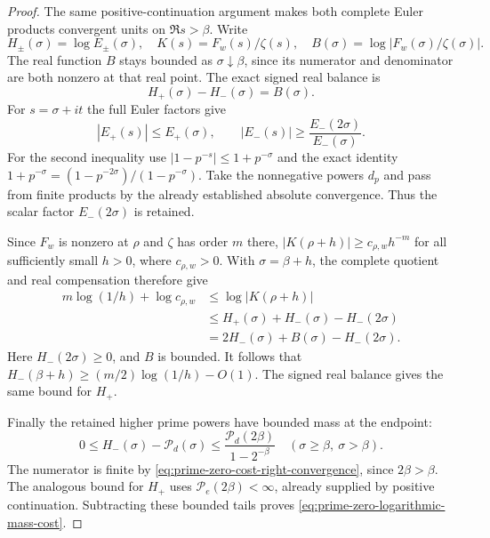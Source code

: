 \documentclass[11pt]{article}
\theoremstyle{definition}
\begin{document}
\begin{proof}
The same positive-continuation argument makes both complete
Euler products convergent units on $\Re s>\beta$.
Write
\[
 H_\pm(\sigma)=\log E_\pm(\sigma),\quad
 K(s)=F_w(s)/\zeta(s),\quad
 B(\sigma)=\log|F_w(\sigma)/\zeta(\sigma)|.
\]
The real function $B$ stays bounded as $\sigma\downarrow\beta$,
since its numerator and denominator are both nonzero at
that real point. The exact signed real balance is
\[
                       H_+(\sigma)-H_-(\sigma)=B(\sigma).
\]
For $s=\sigma+it$ the full Euler factors give
\begin{equation}
 |E_+(s)|\le E_+(\sigma),\qquad
 |E_-(s)|\ge\frac{E_-(2\sigma)}{E_-(\sigma)}.
 \label{eq:prime-zero-complete-product-norm}
\end{equation}
For the second inequality use
$|1-p^{-s}|\le1+p^{-\sigma}$ and the exact identity
$1+p^{-\sigma}=(1-p^{-2\sigma})/(1-p^{-\sigma})$.
Take the nonnegative powers $d_p$ and pass from finite
products by the already established absolute convergence.
Thus the scalar factor $E_-(2\sigma)$ is retained.

Since $F_w$ is nonzero at $\rho$ and $\zeta$ has order $m$
there, $|K(\rho+h)|\ge c_{\rho,w}h^{-m}$ for all sufficiently
small $h>0$, where $c_{\rho,w}>0$.
With $\sigma=\beta+h$, the complete quotient and real
compensation therefore give
\begin{equation}
 \begin{aligned}
 m\log(1/h)+\log c_{\rho,w}
    &\le\log|K(\rho+h)|\\
    &\le H_+(\sigma)+H_-(\sigma)-H_-(2\sigma)\\
    &=2H_-(\sigma)+B(\sigma)-H_-(2\sigma).
 \end{aligned}
 \label{eq:prime-zero-full-signed-pole-consumer}
\end{equation}
Here $H_-(2\sigma)\ge0$, and $B$ is bounded.
It follows that $H_-(\beta+h)\ge(m/2)\log(1/h)-O(1)$.
The signed real balance gives the same bound for $H_+$.

Finally the retained higher prime powers have bounded mass
at the endpoint:
\[
 0\le H_-(\sigma)-\mathcal P_d(\sigma)
       \le\frac{\mathcal P_d(2\beta)}{1-2^{-\beta}}
                  \quad(\sigma\ge\beta,\ \sigma>\beta).
\]
The numerator is finite by
\eqref{eq:prime-zero-cost-right-convergence}, since $2\beta>\beta$.
The analogous bound for $H_+$ uses
$\mathcal P_e(2\beta)<\infty$, already supplied by positive
continuation. Subtracting these bounded tails proves
\eqref{eq:prime-zero-logarithmic-mass-cost}.
\end{proof}
\end{document}
